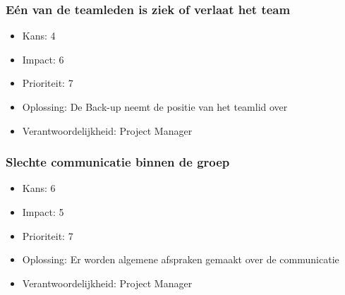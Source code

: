 \begin{comment}
  Kan zich verliezen in details \\
  Is niet goed met deadlines \\
  Perfectionistisch \\  
   \\
  \textbf{Yannick Verschueren} \\
  \hline
  \underline{Positief} \\
  Kent Javascript \\
  Is goed met deadlines \\
  Is goed met taal \\
  \underline{Negatief} \\
  Kent geen HTML en CSS \\
  Is laks \\
\\
  \textbf{Wout Van Riel} \\
  \hline
  \underline{Positief} \\
  Heeft een basis in HTML en CSS \\
  Heeft managment ervaring \\
  Graphic design \\
  \underline{Negatief} \\
  Kent geen Javascript \\
  Is laks \\
 
\caption{Persoonlijke Risico Analyse}
\label{tab:pra}
\end{longtable}

\subsubsection{Project risico's}
\end{comment}

\subsubsection{Eén van de teamleden is ziek of verlaat het team}
\begin{itemize}
\item Kans: 4
\item Impact: 6
\item Prioriteit: 7
\item Oplossing: De Back-up neemt de positie van het teamlid over
\item Verantwoordelijkheid: Project Manager
\end{itemize}

\subsubsection{Slechte communicatie binnen de groep}
\begin{itemize}
\item Kans: 6
\item Impact: 5
\item Prioriteit: 7
\item Oplossing: Er worden algemene afspraken gemaakt over de communicatie
\item Verantwoordelijkheid: Project Manager
\end{itemize}

